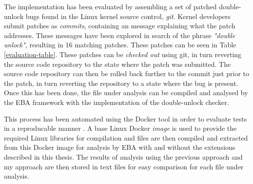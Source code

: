 \newpar The implementation has been evaluated by assembling a set of patched double-unlock bugs found in the Linux kernel source control, \textit{git}. Kernel developers submit patches as \textit{commits}, containing an message explaining what the patch addresses. These messages have been explored in search of the phrase \textit{"double unlock"}, resulting in 16 matching patches. These patches can be seen in Table \ref{evaluation-table}. These patches can be \textit{checked out} using git, in turn reverting the source code repository to the state where the patch was submitted. The source code repository can then be rolled back further to the commit just prior to the patch, in turn reverting the repository to a state where the bug is present. Once this has been done, the file under analysis can be compiled and analysed by the EBA framework with the implementation of the double-unlock checker. 

\newpar This process has been automated using the Docker tool in order to evaluate tests in a reproducable manner \cite{docker}. A base Linux Docker \textit{image} is used to provide the required Linux libraries for compilation and files are then compiled and extracted from this Docker image for analysis by EBA with and without the extensions described in this thesis. The results of analysis using the previous approach and my approach are then stored in text files for easy comparison for each file under analysis. 


